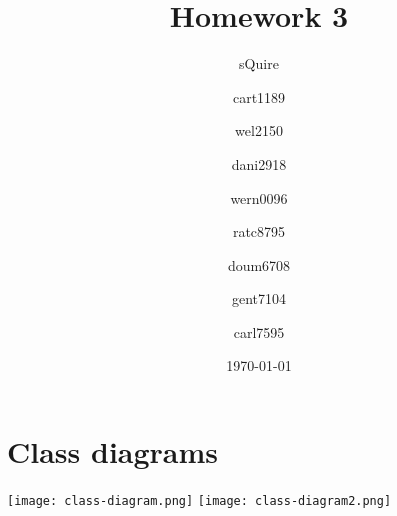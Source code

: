 \documentclass[12pt]{scrartcl}
\title{Homework 3}
\subtitle{sQuire}
\author{ 
cart1189\and
wel2150\and
dani2918\and
wern0096\and
ratc8795\and
doum6708\and
gent7104\and
carl7595\and
}
\date{\today}
\begin{document}
\begin{titlepage}
\maketitle
\tableofcontents
\end{titlepage}
\section{Class diagrams}
\texttt{[image: class-diagram.png]}
\texttt{[image: class-diagram2.png]}
\end{document}

